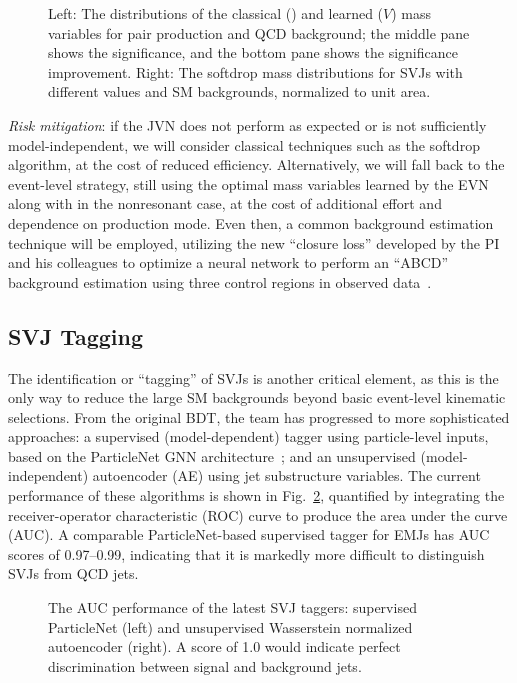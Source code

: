 \begin{figure}[htb!]
\centering
{}
\caption{Left: The distributions of the classical (\mTii) and learned ($V$) mass variables for \Pbifun pair production and QCD background; the middle pane shows the significance, and the bottom pane shows the significance improvement. Right: The softdrop mass distributions for SVJs with different \mdark values and SM backgrounds, normalized to unit area.}
\label{fig:svjmass}
\end{figure}

\textit{Risk mitigation}: if the JVN does not perform as expected or is not sufficiently model-independent, we will consider classical techniques such as the softdrop algorithm, at the cost of reduced efficiency.
Alternatively, we will fall back to the event-level strategy,
still using the optimal mass variables learned by the EVN along with \ptmiss in the nonresonant case, at the cost of additional effort and dependence on production mode.
Even then, a common background estimation technique will be employed, utilizing the new ``closure loss'' developed by the PI and his colleagues
to optimize a neural network to perform an ``ABCD'' background estimation using three control regions in observed data~\cite{Crossman:2023aps}.

\subsection{SVJ Tagging}\label{subsec:tagging}

The identification or ``tagging'' of SVJs is another critical element, as this is the only way to reduce the large SM backgrounds beyond basic event-level kinematic selections.
From the original BDT, the team has progressed to more sophisticated approaches:
a supervised (model-dependent) tagger using particle-level inputs, based on the ParticleNet GNN architecture~\cite{Qu:2019gqs};
and an unsupervised (model-independent) autoencoder (AE) using jet substructure variables.
The current performance of these algorithms is shown in Fig.~\ref{fig:svjtaggers}, quantified by integrating the receiver-operator characteristic (ROC) curve to produce the area under the curve (AUC).
A comparable ParticleNet-based supervised tagger for EMJs has AUC scores of 0.97--0.99, indicating that it is markedly more difficult to distinguish SVJs from QCD jets.

\begin{figure}[htb!]
\centering
{}
\caption{The AUC performance of the latest SVJ taggers: supervised ParticleNet (left) and unsupervised Wasserstein normalized autoencoder (right).
A score of 1.0 would indicate perfect discrimination between signal and background jets.}
\label{fig:svjtaggers}
\end{figure}


